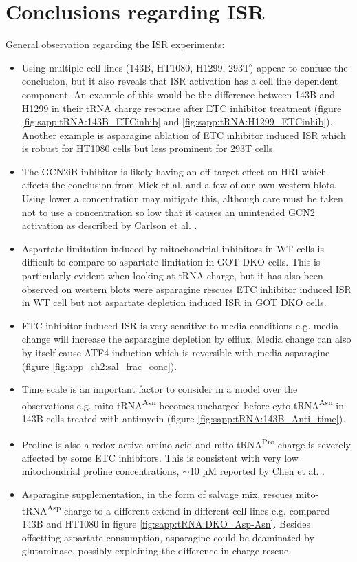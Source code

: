 \section{Conclusions regarding ISR}
General observation regarding the ISR experiments:
\begin{itemize}
    \item Using multiple cell lines (143B, HT1080, H1299, 293T) appear to confuse the conclusion, but it also reveals that ISR activation has a cell line dependent component.
    An example of this would be the difference between 143B and H1299 in their tRNA charge response after ETC inhibitor treatment (figure \ref{fig:sapp:tRNA:143B_ETCinhib} and \ref{fig:sapp:tRNA:H1299_ETCinhib}).
    Another example is asparagine ablation of ETC inhibitor induced ISR which is robust for HT1080 cells but less prominent for 293T cells.
    \item The GCN2iB inhibitor is likely having an off-target effect on HRI which affects the conclusion from Mick et al. \cite{Mick2020-kf} and a few of our own western blots.
    Using lower a concentration may mitigate this, although care must be taken not to use a concentration so low that it causes an unintended GCN2 activation as described by Carlson et al. \cite{Carlson2023-zh}.
    \item Aspartate limitation induced by mitochondrial inhibitors in WT cells is difficult to compare to aspartate limitation in GOT DKO cells.
    This is particularly evident when looking at tRNA charge, but it has also been observed on western blots were asparagine rescues ETC inhibitor induced ISR in WT cell but not aspartate depletion induced ISR in GOT DKO cells.
    \item ETC inhibitor induced ISR is very sensitive to media conditions e.g. media change will increase the asparagine depletion by efflux.
    Media change can also by itself cause ATF4 induction which is reversible with media asparagine (figure \ref{fig:app_ch2:sal_frac_conc}).    
    \item Time scale is an important factor to consider in a model over the observations e.g. mito-tRNA\textsuperscript{Asn} becomes uncharged before cyto-tRNA\textsuperscript{Asn} in 143B cells treated with antimycin (figure \ref{fig:sapp:tRNA:143B_Anti_time}).
    \item Proline is also a redox active amino acid and mito-tRNA\textsuperscript{Pro} charge is severely affected by some ETC inhibitors.
    This is consistent with very low mitochondrial proline concentrations, $\sim$10 µM reported by Chen et al. \cite{Chen2016-mf}.
    \item Asparagine supplementation, in the form of salvage mix, rescues mito-tRNA\textsuperscript{Asp} charge to a different extend in different cell lines e.g. compared 143B and HT1080 in figure \ref{fig:sapp:tRNA:DKO_Asp-Asn}.
    Besides offsetting aspartate consumption, asparagine could be deaminated by glutaminase, possibly explaining the difference in charge rescue.
\end{itemize}



